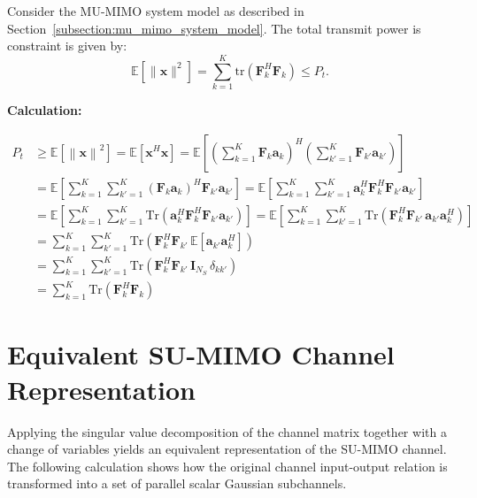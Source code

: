 Consider the \ac{MU}-\ac{MIMO} system model as described in Section~\ref{subsection:mu_mimo_system_model}.
The total transmit power is constraint is given by:
\begin{equation*}
    \mathbb{E}\!\left[\|\mathbf{x}\|^2\right] = \sum_{k=1}^{K} \mathrm{tr}\!\left(\mathbf{F}_k^H \mathbf{F}_k\right) \leq P_t.
\end{equation*}

\textbf{Calculation:}
\begin{fleqn}[2.5em]
\begin{subequations}
\begin{align*}
    P_t
    &\geq \mathbb{E}\!\left[ \left\|\mathbf{x}\right\|^2 \right]
    = \mathbb{E}\!\left[ \mathbf{x}^H \mathbf{x} \right]
    = \mathbb{E}\!\left[ \left(\sum_{k=1}^{K} \mathbf{F}_k \mathbf{a}_k\right)^H \left(\sum_{k'=1}^{K} \mathbf{F}_{k'} \mathbf{a}_{k'}\right) \right] \\
    &= \mathbb{E}\!\left[ \sum_{k=1}^{K} \sum_{k'=1}^{K} \left(\mathbf{F}_k \mathbf{a}_k \right)^H \mathbf{F}_{k'} \mathbf{a}_{k'} \right]
    = \mathbb{E}\!\left[ \sum_{k=1}^{K} \sum_{k'=1}^{K} \mathbf{a}_k^H \mathbf{F}_k^H \mathbf{F}_{k'} \mathbf{a}_{k'} \right] \\
    &= \mathbb{E}\!\left[ \sum_{k=1}^{K} \sum_{k'=1}^{K} \text{Tr}\!\left( \mathbf{a}_k^H \mathbf{F}_k^H \mathbf{F}_{k'} \mathbf{a}_{k'} \right) \right]
    = \mathbb{E}\!\left[ \sum_{k=1}^{K} \sum_{k'=1}^{K} \text{Tr}\!\left( \mathbf{F}_k^H \mathbf{F}_{k'} \, \mathbf{a}_{k'} \mathbf{a}_k^H \right) \right] \\
    &= \sum_{k=1}^{K} \sum_{k'=1}^{K} \text{Tr}\!\left( \mathbf{F}_k^H \mathbf{F}_{k'} \, \mathbb{E}\!\left[ \mathbf{a}_{k'} \mathbf{a}_k^H \right] \right) \\
    &= \sum_{k=1}^{K} \sum_{k'=1}^{K} \text{Tr}\!\left( \mathbf{F}_k^H \mathbf{F}_{k'} \, \mathbf{I}_{N_S} \, \delta_{kk'} \right) \\
    &= \sum_{k=1}^{K} \text{Tr}\!\left( \mathbf{F}_k^H \mathbf{F}_{k} \right)
\end{align*}
\end{subequations}
\end{fleqn}

\section*{Equivalent SU-MIMO Channel Representation}
\label{calculation:su_mimo_equivalent_channel}

Applying the singular value decomposition of the channel matrix together with a change of variables yields an equivalent representation of the \ac{SU}-\ac{MIMO} channel. The following calculation shows how the original channel input-output relation is transformed into a set of parallel scalar Gaussian subchannels.


